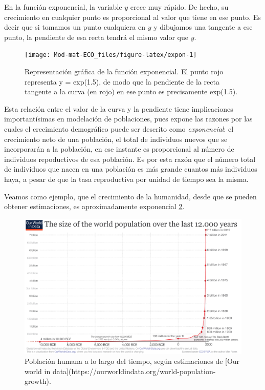 \documentclass[
]{book}
\begin{document}
En la función exponencial, la variable \(y\) crece muy rápido. De hecho, su crecimiento en cualquier punto es proporcional al valor que tiene en ese punto. Es decir que si tomamos un punto cualquiera en \(y\) y dibujamos una tangente a ese punto, la pendiente de esa recta tendrá el mismo valor que \(y\).

\begin{figure}

{\centering \texttt{[image: Mod-mat-ECO\_files/figure-latex/expon-1]} 

}

\caption{Representación gráfica de la función exponencial. El punto rojo representa y = exp(1.5), de modo que la pendiente de la recta tangente a la curva (en rojo) en ese punto es precisamente exp(1.5).}\label{fig:expon}
\end{figure}

Esta relación entre el valor de la curva y la pendiente tiene implicaciones importantísimas en modelación de poblaciones, pues expone las razones por las cuales el crecimiento demográfico puede ser descrito como \emph{exponencial}: el crecimiento neto de una población, el total de individuos nuevos que se incorporarán a la población, en ese instante es proporcional al número de individuos repoductivos de esa población. Es por esta razón que el número total de individuos que nacen en una población es más grande cuantos más individuos haya, a pesar de que la tasa reproductiva por unidad de tiempo sea la misma.

Veamos como ejemplo, que el crecimiento de la humanidad, desde que se pueden obtener estimaciones, es aproximadamente exponencial \ref{fig:popn-wd}.

\begin{figure}

{\centering \includegraphics[width=38.22in]{Unidad-II/popn} 

}

\caption{Población humana a lo largo del tiempo, según estimaciones de [Our world in data](https://ourworldindata.org/world-population-growth).}\label{fig:popn-wd}
\end{figure}
\end{document}
